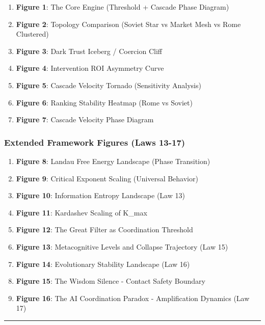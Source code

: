 \documentclass[11pt,letterpaper]{article}
\providecommand{\tightlist}{%
  \setlength{\itemsep}{0pt}\setlength{\parskip}{0pt}}
\begin{document}
\begin{enumerate}
\def\labelenumi{\arabic{enumi}.}
\tightlist
\item
  \textbf{Figure 1}: The Core Engine (Threshold + Cascade Phase Diagram)
\item
  \textbf{Figure 2}: Topology Comparison (Soviet Star vs Market Mesh vs
  Rome Clustered)
\item
  \textbf{Figure 3}: Dark Trust Iceberg / Coercion Cliff
\item
  \textbf{Figure 4}: Intervention ROI Asymmetry Curve
\item
  \textbf{Figure 5}: Cascade Velocity Tornado (Sensitivity Analysis)
\item
  \textbf{Figure 6}: Ranking Stability Heatmap (Rome vs Soviet)
\item
  \textbf{Figure 7}: Cascade Velocity Phase Diagram
\end{enumerate}

\subsubsection{Extended Framework Figures (Laws
13-17)}\label{extended-framework-figures-laws-13-17}

\begin{enumerate}
\def\labelenumi{\arabic{enumi}.}
\setcounter{enumi}{7}
\tightlist
\item
  \textbf{Figure 8}: Landau Free Energy Landscape (Phase Transition)
\item
  \textbf{Figure 9}: Critical Exponent Scaling (Universal Behavior)
\item
  \textbf{Figure 10}: Information Entropy Landscape (Law 13)
\item
  \textbf{Figure 11}: Kardashev Scaling of K\_max
\item
  \textbf{Figure 12}: The Great Filter as Coordination Threshold
\item
  \textbf{Figure 13}: Metacognitive Levels and Collapse Trajectory (Law
  15)
\item
  \textbf{Figure 14}: Evolutionary Stability Landscape (Law 16)
\item
  \textbf{Figure 15}: The Wisdom Silence - Contact Safety Boundary
\item
  \textbf{Figure 16}: The AI Coordination Paradox - Amplification
  Dynamics (Law 17)
\end{enumerate}

\begin{center}\rule{0.5\linewidth}{0.5pt}\end{center}
\end{document}
